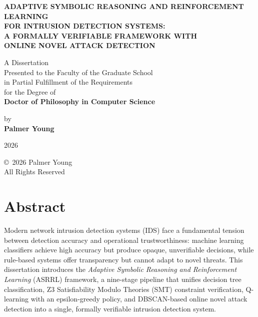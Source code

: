 \documentclass[12pt, letterpaper, oneside]{report}
\newcommand{\ASRRL}{\textsc{ASRRL}}
\begin{document}
\begin{titlepage}
\centering
\vspace*{1in}

{\Large\bfseries ADAPTIVE SYMBOLIC REASONING AND REINFORCEMENT LEARNING\\
FOR INTRUSION DETECTION SYSTEMS:\\
A FORMALLY VERIFIABLE FRAMEWORK WITH\\
ONLINE NOVEL ATTACK DETECTION}

\vspace{1.5in}

{\large A Dissertation\\
Presented to the Faculty of the Graduate School\\
in Partial Fulfillment of the Requirements\\
for the Degree of\\[0.5em]
\textbf{Doctor of Philosophy in Computer Science}}

\vspace{1.5in}

{\large by\\[0.5em]
\textbf{Palmer Young}}

\vspace{1.5in}

{\large 2026}

\end{titlepage}

\thispagestyle{empty}
\vspace*{\fill}
\begin{center}
\copyright\ 2026 Palmer Young\\
All Rights Reserved
\end{center}
\vspace*{\fill}
\clearpage

\setcounter{page}{3}

\chapter*{Abstract}

Modern network intrusion detection systems (IDS) face a fundamental tension between detection accuracy and operational trustworthiness: machine learning classifiers achieve high accuracy but produce opaque, unverifiable decisions, while rule-based systems offer transparency but cannot adapt to novel threats. This dissertation introduces the \emph{Adaptive Symbolic Reasoning and Reinforcement Learning} (\ASRRL{}) framework, a nine-stage pipeline that unifies decision tree classification, Z3 Satisfiability Modulo Theories (SMT) constraint verification, Q-learning with an epsilon-greedy policy, and DBSCAN-based online novel attack detection into a single, formally verifiable intrusion detection system.
\end{document}
